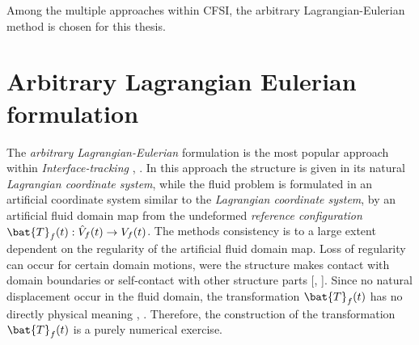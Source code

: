 Among the multiple approaches within CFSI, the arbitrary Lagrangian-Eulerian method is chosen for this thesis. 






\newpage
\section{Arbitrary Lagrangian Eulerian formulation}
The \textit{arbitrary Lagrangian-Eulerian} formulation is the most popular approach within \textit{Interface-tracking} \cite{Richter2010a}, \cite{Frei2016}. In this approach the structure is given in its natural \textit{Lagrangian coordinate system}, while the fluid problem is formulated in an artificial coordinate system similar to the \textit{Lagrangian coordinate system}, by an artificial fluid domain map from the undeformed \textit{reference configuration} $\bat{T}_f (t): \hat{V}_f (t) \rightarrow V_f (t)$. The methods consistency is to a large extent dependent on the regularity of the artificial fluid domain map. Loss of regularity can occur for certain domain motions, were the structure makes contact with domain boundaries or self-contact with other structure parts  [\cite{Wriggers2006}, \cite{Richter2016}].  Since no natural displacement occur in the fluid domain, the transformation $\bat{T}_f (t)$ has no directly physical meaning \cite{Richter2010a}, \cite{Donea2004}. Therefore, the construction of the transformation $\bat{T}_f (t)$ is a purely numerical exercise.
\newpage
